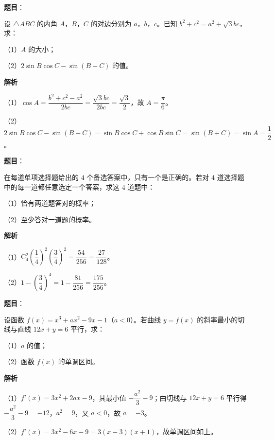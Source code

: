 \begin{answer}

\textbf{题目}：

设 $\triangle ABC$ 的内角 $A$，$B$，$C$ 的对边分别为 $a$，$b$，$c$。已知 $b^2+c^2=a^2+\sqrt3bc$，求：

（1）$A$ 的大小；

（2）$2\sin B\cos C-\sin(B-C)$ 的值。

\textbf{解析}

（1）$\cos A=\dfrac{b^2+c^2-a^2}{2bc}=\dfrac{\sqrt3bc}{2bc}=\dfrac{\sqrt3}2$，故 $A=\dfrac{\pi}6$。

（2）$2\sin B\cos C-\sin(B-C)=\sin B\cos C+\cos B\sin C=\sin(B+C)=\sin A=\dfrac12$。


\end{answer}
\begin{answer}

\textbf{题目}：

在每道单项选择题给出的 $4$ 个备选答案中，只有一个是正确的。若对 $4$ 道选择题中的每一道都任意选定一个答案，求这 $4$ 道题中：

（1）恰有两道题答对的概率；

（2）至少答对一道题的概率。

\textbf{解析}

（1）$\mathrm C_4^2\left(\dfrac14\right)^2\left(\dfrac34\right)^2=\dfrac{54}{256}=\dfrac{27}{128}$。

（2）$1-\left(\dfrac34\right)^4=1-\dfrac{81}{256}=\dfrac{175}{256}$。


\end{answer}
\begin{answer}

\textbf{题目}：

设函数 $f(x)=x^3+ax^2-9x-1$（$a<0$）。若曲线 $y=f(x)$ 的斜率最小的切线与直线 $12x+y=6$ 平行，求：

（1）$a$ 的值；

（2）函数 $f(x)$ 的单调区间。

\textbf{解析}

（1）$f'(x)=3x^2+2ax-9$，其最小值 $-\dfrac{a^2}3-9$；由切线与 $12x+y=6$ 平行得 $-\dfrac{a^2}3-9=-12$，$a^2=9$，又 $a<0$，故 $a=-3$。

（2）$f'(x)=3x^2-6x-9=3(x-3)(x+1)$，故单调区间如上。


\end{answer}
